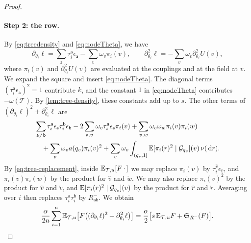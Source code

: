 \begin{proof}
\paragraph{Step 2: the row.}
By \eqref{eq:treedensity} and \eqref{eq:nodeTheta}, we have
\[
 \partial_{\theta_i}\ell=\sum_{\mathsf a}\tau_i^{\mathsf a}\epsilon_{\mathsf a}
   -\sum_v\omega_v\pi_i(v),
 \qquad
 \partial_{\theta_i}^2\ell=-\sum_v\omega_v\partial_{\theta_i}^2U(v),
\]
where $\pi_i(v)$ and $\partial_{\theta_i}^2U(v)$ are evaluated at the
couplings and at the field at $v$. We expand the square and insert
\eqref{eq:nodeTheta}. The diagonal terms
$(\tau_i^{\mathsf a}\epsilon_{\mathsf a})^2=1$ contribute $k$, and the
constant $1$ in \eqref{eq:nodeTheta} contributes $-\omega(\mathcal T)$.
By \cref{lem:tree-density}, these constants add up to $s$. The other
terms of $(\partial_{\theta_i}\ell)^2+\partial_{\theta_i}^2\ell$ are
\[
 \begin{aligned}
 &\sum_{\mathsf a\ne\mathsf b}\tau_i^{\mathsf a}\epsilon_{\mathsf a}
   \tau_i^{\mathsf b}\epsilon_{\mathsf b}
 -2\sum_{\mathsf a,v}\omega_v\tau_i^{\mathsf a}\epsilon_{\mathsf a}\pi_i(v)
 +\sum_{v,w}\omega_v\omega_w\pi_i(v)\pi_i(w)\\
 &\quad+\sum_v\omega_va(q_v)\pi_i(v)^2
 +\sum_v\omega_v\int_{(q_v,1]}\mathbb E[\pi_i(r)^2\mid\mathcal G_{q_v}](v)\,\nu(\,\mathrm d r).
 \end{aligned}
\]
By \eqref{eq:tree-replacement}, inside $\mathbb E_{\mathcal T,u}[F\,\cdot\,]$
we may replace $\pi_i(v)$ by $\tau_i^{\hat v}\epsilon_{\hat v}$, and
$\pi_i(v)\pi_i(w)$ by the product for $\hat v$ and $\check w$. We may
also replace $\pi_i(v)^2$ by the product for $\hat v$ and $\check v$, and
$\mathbb E[\pi_i(r)^2\mid\mathcal G_{q_v}](v)$ by the product for $\hat r$ and
$\check r$. Averaging over $i$ then replaces
$\tau_i^{\mathsf a}\tau_i^{\mathsf b}$ by $R^-_{\mathsf{ab}}$. We obtain
\begin{equation}\label{eq:tree-row-part}
 \frac\alpha{2n}\sum_{i=1}^n\mathbb E_{\mathcal T,u}\bigl[F\bigl(
   (\partial_{\theta_i}\ell)^2+\partial_{\theta_i}^2\ell\bigr)\bigr]
 =\frac\alpha2\bigl[s\,\mathbb E_{\mathcal T,u}F+\mathfrak S_{R^-}(F)\bigr].
\end{equation}


\end{proof}
